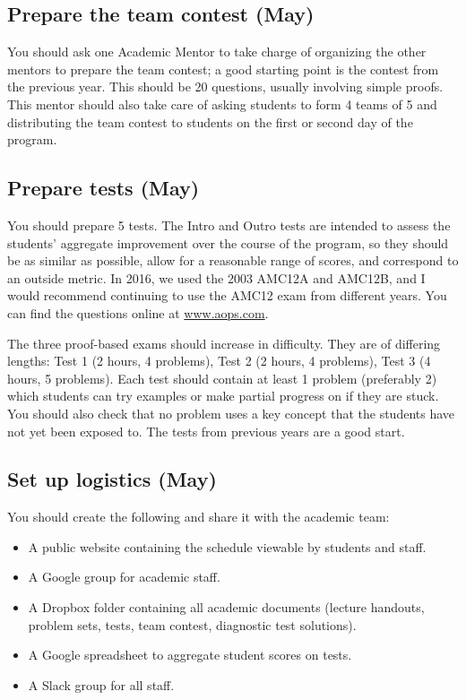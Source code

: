 \documentclass[10pt]{amsart}
\begin{document}
\subsection{Prepare the team contest (May)}

You should ask one Academic Mentor to take charge of organizing the other mentors to prepare the team contest; a good starting point is the contest from the previous year.  This should be 20 questions, usually involving simple proofs.  This mentor should also take care of asking students to form 4 teams of 5 and distributing the team contest to students on the first or second day of the program.

\subsection{Prepare tests (May)}

You should prepare 5 tests.  The Intro and Outro tests are intended to assess the students' aggregate improvement over the course of the program, so they should be as similar as possible, allow for a reasonable range of scores, and correspond to an outside metric.  In 2016, we used the 2003 AMC12A and AMC12B, and I would recommend continuing to use the AMC12 exam from different years.  You can find the questions online at \url{www.aops.com}.

The three proof-based exams should increase in difficulty.  They are of differing lengths: Test 1 (2 hours, 4 problems), Test 2 (2 hours, 4 problems), Test 3 (4 hours, 5 problems).  Each test should contain at least 1 problem (preferably 2) which students can try examples or make partial progress on if they are stuck.  You should also check that no problem uses a key concept that the students have not yet been exposed to.  The tests from previous years are a good start.

\subsection{Set up logistics (May)}

You should create the following and share it with the academic team:
\begin{itemize}
\item A public website containing the schedule viewable by students and staff.

\item A Google group for academic staff.

\item A Dropbox folder containing all academic documents (lecture handouts, problem sets, tests, team contest, diagnostic test solutions).

\item A Google spreadsheet to aggregate student scores on tests.

\item A Slack group for all staff.
\end{itemize}
\end{document}

